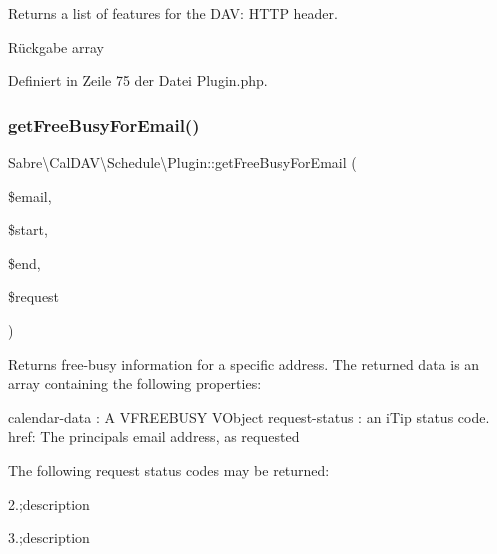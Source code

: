 Returns a list of features for the D\+AV\+: H\+T\+TP header.

\begin{DoxyReturn}{Rückgabe}
array 
\end{DoxyReturn}


Definiert in Zeile 75 der Datei Plugin.\+php.

\mbox{\label{class_sabre_1_1_cal_d_a_v_1_1_schedule_1_1_plugin_a7c3de76ff98827569c641087fd2f3eb9}} 
\subsubsection{\texorpdfstring{get\+Free\+Busy\+For\+Email()}{getFreeBusyForEmail()}}
{\footnotesize\ttfamily Sabre\textbackslash{}\+Cal\+D\+A\+V\textbackslash{}\+Schedule\textbackslash{}\+Plugin\+::get\+Free\+Busy\+For\+Email (\begin{DoxyParamCaption}\item[{}]{\$email,  }\item[{\textbackslash{}Date\+Time\+Interface}]{\$start,  }\item[{\textbackslash{}Date\+Time\+Interface}]{\$end,  }\item[{\mbox{\hyperlink{class_sabre_1_1_v_object_1_1_component}{V\+Object\textbackslash{}\+Component}}}]{\$request }\end{DoxyParamCaption})\hspace{0.3cm}{\ttfamily [protected]}}

Returns free-\/busy information for a specific address. The returned data is an array containing the following properties\+:

calendar-\/data \+: A V\+F\+R\+E\+E\+B\+U\+SY V\+Object request-\/status \+: an i\+Tip status code. href\+: The principal\textquotesingle{}s email address, as requested

The following request status codes may be returned\+:
\begin{DoxyItemize}
\item 2.;description
\item 3.;description
\end{DoxyItemize}


